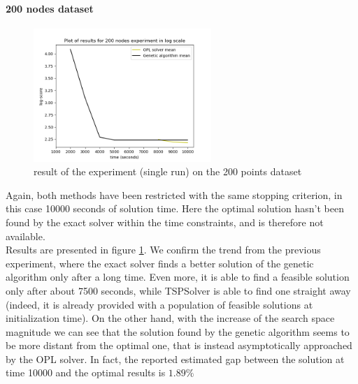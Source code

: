 \documentclass{article}
\begin{document}
\paragraph*{200 nodes dataset}

\begin{figure}
    \centering
\includegraphics[width=0.6\textwidth]{pics/200_nodes_results.png}
\caption{result of the experiment (single run) on the 200 points dataset}
\label{fig:200points}
\end{figure}

Again, both methods have been restricted with the same stopping criterion, in this case 10000 seconds of solution time. Here the optimal solution hasn't been found by the exact solver within the time constraints, and is therefore not available. \\
Results are presented in figure \ref{fig:200points}. We confirm the trend from the previous experiment, where the exact solver finds a better solution of the genetic algorithm only after a long time. Even more, it is able to find a feasible solution only after about 7500 seconds, while TSPSolver is able to find one straight away (indeed, it is already provided with a population of feasible solutions at initialization time). On the other hand, with the increase of the search space magnitude we can see that the solution found by the genetic algorithm seems to be more distant from the optimal one, that is instead asymptotically approached by the OPL solver. In fact, the reported estimated gap between the solution at time 10000 and the optimal results is $1.89\%$ 




\newpage


\end{document}
